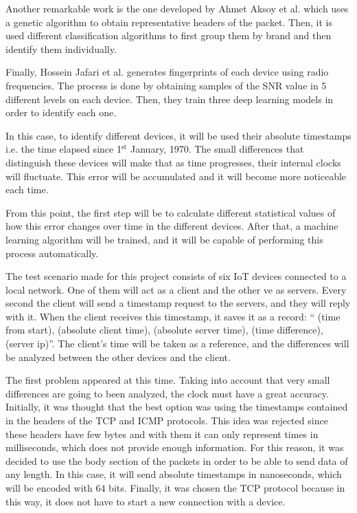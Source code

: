 Another remarkable work is the one developed by Ahmet Aksoy et al. \cite{aksoy2019automated} which uses a genetic algorithm to obtain representative headers of the packet. Then, it is used different classification algorithms to first group them by brand and then identify them individually. 


Finally, Hossein Jafari et al. \cite{jafari2018iot} generates fingerprints of each device using radio frequencies. The process is done by obtaining samples of the SNR value in 5 different levels on each device. Then, they train three deep learning models in order to identify each one.


In this case, to identify different devices, it will be used their absolute timestamps i.e. the time elapsed since 1$^\text{st}$ January, 1970. The small differences that distinguish these devices will make that as time progresses, their internal clocks will fluctuate. This error will be accumulated and it will become more noticeable each time.


From this point, the first step will be to calculate different statistical values of how this error changes over time in the different devices. After that, a machine learning algorithm will be trained, and it will be capable of performing this process automatically.


The test scenario made for this project consists of six IoT devices connected to a local network. One of them will act as a client and the other ve as servers. Every second the client will send a timestamp request to the servers, and they will reply with it. When the client receives this timestamp, it saves it as a record: “ (time from start), (absolute client time), (absolute server time), (time difference), (server ip)”. The client's time will be taken as a reference, and the differences will be analyzed between the other devices and the client.


The first problem appeared at this time. Taking into account that very small differences are going to been analyzed, the clock must have a great accuracy. Initially, it was thought that the best option was using the timestamps contained in the headers of the TCP and ICMP protocols. This idea was rejected since these headers have few bytes and with them it can only represent times in milliseconds, which does not provide enough information. For this reason, it was decided to use the body section of the packets in order to be able to send data of any length. In this case, it will send absolute timestamps in nanoseconds, which will be encoded with 64 bits. Finally, it was chosen the TCP protocol because in this way, it does not have to start a new connection with a device. 


